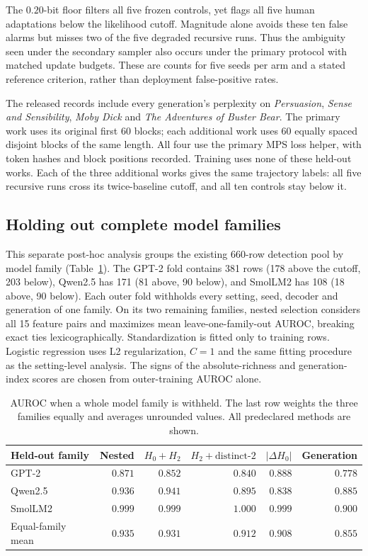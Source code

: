\documentclass[10pt]{article}
\theoremstyle{plain}
\theoremstyle{definition}
\newcommand{\Htwo}{H_2}
\newcommand{\Hz}{H_0}
\begin{document}
The $0.20$-bit floor filters all five frozen controls, yet flags all five human adaptations
below the likelihood cutoff. Magnitude alone avoids these ten false alarms but misses two of
the five degraded recursive runs. Thus the ambiguity seen under the secondary sampler also
occurs under the primary protocol with matched update budgets. These are counts for five
seeds per arm and a stated reference criterion, rather than deployment false-positive rates.

The released records include every generation's perplexity on \emph{Persuasion},
\emph{Sense and Sensibility}, \emph{Moby Dick} and \emph{The Adventures of Buster Bear}.
The primary work uses its original first 60 blocks; each additional work uses 60 equally
spaced disjoint blocks of the same length. All four use the primary MPS loss helper, with
token hashes and block positions recorded. Training uses none of these held-out works.
Each of the three additional works gives the same trajectory labels: all five recursive
runs cross its twice-baseline cutoff, and all ten controls stay below it.

\subsection{Holding out complete model families}
\label{app:familyholdout}

This separate post-hoc analysis groups the existing 660-row detection pool by model family
(Table~\ref{tab:familyholdout}).
The GPT-2 fold contains 381 rows (178 above the cutoff, 203 below), Qwen2.5 has 171
(81 above, 90 below), and SmolLM2 has 108 (18 above, 90 below). Each outer fold withholds
every setting, seed, decoder and generation of one family. On its two remaining families,
nested selection considers all 15 feature pairs and maximizes mean leave-one-family-out AUROC,
breaking exact ties lexicographically. Standardization is fitted only to training rows.
Logistic regression uses L2 regularization, $C=1$ and the same fitting procedure as the
setting-level analysis. The signs of the absolute-richness and generation-index scores are
chosen from outer-training AUROC alone.

\begin{table}[ht]
\centering\small
\setlength{\tabcolsep}{4pt}
\caption{AUROC when a whole model family is withheld. The last row weights the three families equally and averages unrounded values. All predeclared methods are shown.}
\label{tab:familyholdout}
\begin{tabular}{lrrrrr}
\toprule
Held-out family & Nested & $\Hz+\Htwo$ & $\Htwo+\text{distinct-}2$ & $|\Delta\Hz|$ & Generation \\
\midrule
GPT-2 & $0.871$ & $0.852$ & $0.840$ & $0.888$ & $0.778$ \\
Qwen2.5 & $0.936$ & $0.941$ & $0.895$ & $0.838$ & $0.885$ \\
SmolLM2 & $0.999$ & $0.999$ & $1.000$ & $0.999$ & $0.900$ \\
\midrule
Equal-family mean & $0.935$ & $0.931$ & $0.912$ & $0.908$ & $0.855$ \\
\bottomrule
\end{tabular}
\end{table}
\end{document}
